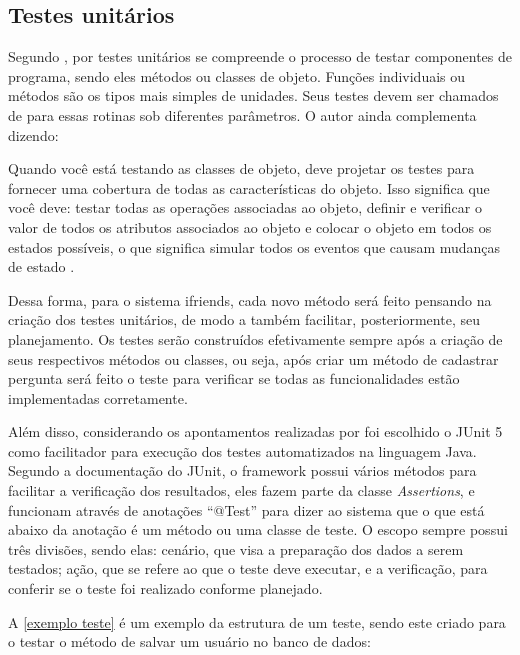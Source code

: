\subsection{Testes unitários}
Segundo , por testes unitários se compreende o processo de testar componentes de programa, sendo eles métodos ou classes de objeto. Funções individuais ou métodos são os tipos mais simples de unidades. Seus testes devem ser chamados de para essas rotinas sob diferentes parâmetros. O autor ainda complementa dizendo: 

\begin{citacao}
Quando você está testando as classes de objeto, deve projetar os testes para fornecer uma cobertura de todas as características do objeto. Isso significa que você deve: testar todas as operações associadas ao objeto, definir e verificar o valor de todos os atributos associados ao objeto e colocar o objeto em todos os estados possíveis, o que significa simular todos os eventos que causam mudanças de estado
\cite{SOMMERVILLE:2011}.
\end{citacao}

Dessa forma, para o sistema \gls{ifriends}, cada novo método será feito pensando na criação dos testes unitários, de modo a também facilitar, posteriormente, seu planejamento. Os testes serão construídos efetivamente sempre após a criação de seus respectivos métodos ou classes, ou seja, após criar um método de cadastrar pergunta será feito o teste para verificar se todas as funcionalidades estão implementadas corretamente.

Além disso, considerando os apontamentos realizadas por  foi escolhido o \gls{JUnit} 5 como facilitador para execução dos testes automatizados na linguagem Java. Segundo a documentação do \gls{JUnit}, o \gls{framework} possui vários métodos para facilitar a verificação dos resultados, eles fazem parte da classe \textit{Assertions}, e funcionam através de anotações ``@Test'' para dizer ao sistema que o que está abaixo da anotação é um método ou uma classe de teste. O escopo sempre possui três divisões, sendo elas: cenário, que visa a preparação dos dados a serem testados; ação, que se refere ao que o teste deve executar, e a verificação, para conferir se o teste foi realizado conforme planejado.

A \autoref{exemplo teste} é um exemplo da estrutura de um teste, sendo este criado para o testar o método de salvar um usuário no banco de dados:

